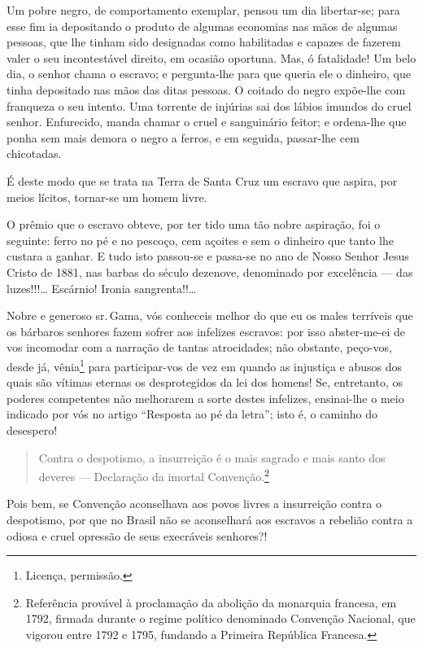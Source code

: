 {Um pobre negro, de comportamento exemplar, pensou um dia libertar-se;
para esse fim ia depositando o produto de algumas economias nas mãos de
algumas pessoas, que lhe tinham sido designadas como habilitadas e
capazes de fazerem valer o seu incontestável direito, em ocasião
oportuna. Mas, ó fatalidade! Um belo dia, o senhor chama o escravo; e
pergunta-lhe para que queria ele o dinheiro, que tinha depositado nas
mãos das ditas pessoas. O coitado do negro expõe-lhe com franqueza o seu
intento. Uma torrente de injúrias sai dos lábios imundos do cruel
senhor. Enfurecido, manda chamar o cruel e sanguinário feitor; e
ordena-lhe que ponha sem mais demora o negro a ferros, e em seguida,
passar-lhe cem chicotadas.

É deste modo que se trata na Terra de Santa Cruz um escravo que aspira,
por meios lícitos, tornar-se um homem livre.

O prêmio que o escravo obteve, por ter tido uma tão nobre aspiração, foi
o seguinte: ferro no pé e no pescoço, cem açoites e sem o dinheiro que
tanto lhe custara a ganhar. E tudo isto passou-se e passa-se no ano de
Nosso Senhor Jesus Cristo de 1881, nas barbas do século dezenove,
denominado por excelência --- das luzes!!!\ldots{} Escárnio! Ironia
sangrenta!!\ldots{}

Nobre e generoso sr.\,Gama, vós conheceis melhor do que eu os males
terríveis que os bárbaros senhores fazem sofrer aos infelizes escravos:
por isso abster-me-ei de vos incomodar com a narração de tantas
atrocidades; não obstante, peço-vos, desde já, vênia\footnote{Licença,
  permissão.} para participar-vos de vez em quando as injustiça e abusos
dos quais são vítimas eternas os desprotegidos da lei dos homens! Se,
entretanto, os poderes competentes não melhorarem a sorte destes
infelizes, ensinai-lhe o meio indicado por vós no artigo ``Resposta
ao pé da letra''; isto é, o caminho do desespero!

\begin{quote}
Contra o despotismo, a insurreição é o mais sagrado e mais santo dos
deveres --- Declaração da imortal Convenção.\footnote{Referência
  provável à proclamação da abolição da monarquia francesa, em 1792,
  firmada durante o regime político denominado Convenção Nacional, que
  vigorou entre 1792 e 1795, fundando a Primeira República Francesa.}
\end{quote}

Pois bem, se Convenção aconselhava aos povos livres a insurreição contra
o despotismo, por que no Brasil não se aconselhará aos escravos a
rebelião contra a odiosa e cruel opressão de seus execráveis senhores?!

}
